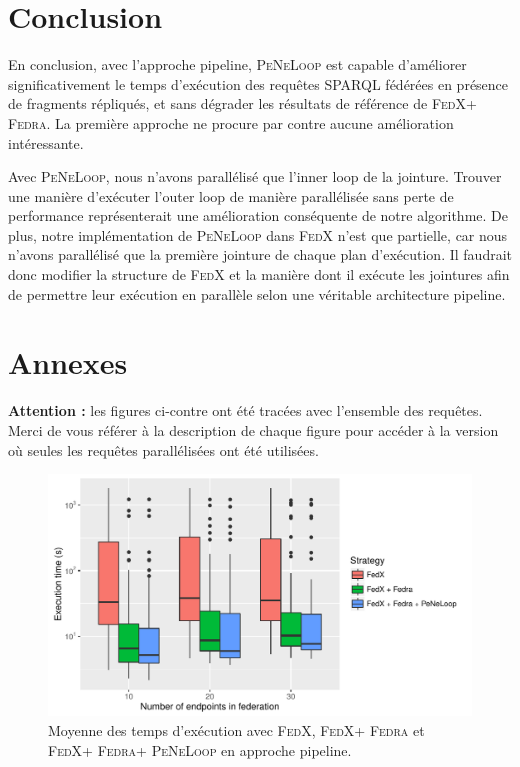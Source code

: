 \documentclass[a4paper]{article}
\def\sparql{\textsc{SPARQL}\xspace}
\def\fedra{\textsc{Fedra}\xspace}
\def\fedx{\textsc{FedX}\xspace}
\def\peneloop{\textsc{PeNeLoop}\xspace}
\begin{document}
\section{Conclusion}

En conclusion, avec l'approche pipeline, \peneloop est capable d'améliorer significativement le temps d'exécution des requêtes \sparql fédérées en présence de fragments répliqués, et sans dégrader les résultats de référence de \fedx + \fedra. La première approche ne procure par contre aucune amélioration intéressante.

Avec \peneloop, nous n'avons parallélisé que l'inner loop de la jointure. Trouver une manière d'exécuter l'outer loop de manière parallélisée sans perte de performance représenterait une amélioration conséquente de notre algorithme. De plus, notre implémentation de \peneloop dans \fedx n'est que partielle, car nous n'avons parallélisé que la première jointure de chaque plan d'exécution. Il faudrait donc modifier la structure de \fedx et la manière dont il exécute les jointures afin de permettre leur exécution en parallèle selon une véritable architecture pipeline.




\section{Annexes}

\textbf{Attention :} les figures ci-contre ont été tracées avec l'ensemble des requêtes. Merci de vous référer à la description de chaque figure pour accéder à la version où seules les requêtes parallélisées ont été utilisées.

\begin{figure}[h]
    \centering
    \includegraphics{boxplots/avg_execution_time.pdf}
    \caption{Moyenne des temps d'exécution avec \fedx, \fedx + \fedra et \fedx + \fedra + \peneloop en approche pipeline.}
    \label{fig:avg_time}
\end{figure}
\end{document}
